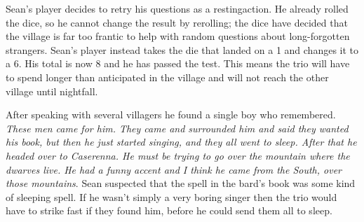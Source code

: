 
\begin{exampletext}

  Sean's player decides to retry his questions as a \gls{restingaction}.
  He already rolled the dice, so he cannot change the result by rerolling; the dice have decided that the village is far too frantic to help with random questions about long-forgotten strangers.
  Sean's player instead takes the die that landed on a 1 and changes it to a 6.
  His total is now 8 and he has passed the test.
  This means the trio will have to spend longer than anticipated in the village and will not reach the other village until nightfall.

  After speaking with several villagers he found a single boy who remembered. \emph{These men came for him. They came and surrounded him and said they wanted his book, but then he just started singing, and they all went to sleep. After that he headed over to Caserenna. He must be trying to go over the mountain where the dwarves live. He had a funny accent and I think he came from the South, over those mountains}. Sean suspected that the spell in the bard's book was some kind of sleeping spell. If he wasn't simply a very boring singer then the trio would have to strike fast if they found him, before he could send them all to sleep.

\end{exampletext}
